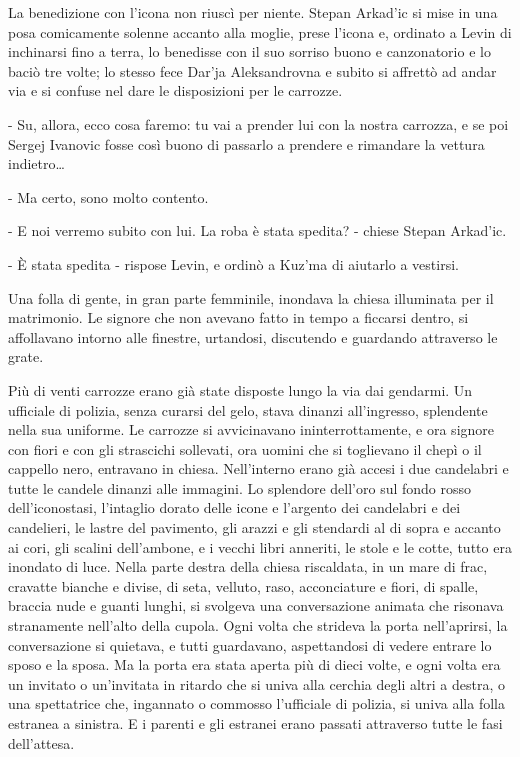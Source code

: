 La benedizione con l'icona non riuscì per niente. Stepan Arkad'ic si mise in una posa comicamente solenne accanto alla moglie, prese l'icona e, ordinato a Levin di inchinarsi fino a terra, lo benedisse con il suo sorriso buono e canzonatorio e lo baciò tre volte; lo stesso fece Dar'ja Aleksandrovna e subito si affrettò ad andar via e si confuse nel dare le disposizioni per le carrozze. 

- Su, allora, ecco cosa faremo: tu vai a prender lui con la nostra carrozza, e se poi Sergej Ivanovic fosse così buono di passarlo a prendere e rimandare la vettura indietro\ldots{} 

- Ma certo, sono molto contento. 

- E noi verremo subito con lui. La roba è stata spedita? - chiese Stepan Arkad'ic. 

- È stata spedita - rispose Levin, e ordinò a Kuz'ma di aiutarlo a vestirsi. 

Una folla di gente, in gran parte femminile, inondava la chiesa illuminata per il matrimonio. Le signore che non avevano fatto in tempo a ficcarsi dentro, si affollavano intorno alle finestre, urtandosi, discutendo e guardando attraverso le grate. 

Più di venti carrozze erano già state disposte lungo la via dai gendarmi. Un ufficiale di polizia, senza curarsi del gelo, stava dinanzi all'ingresso, splendente nella sua uniforme. Le carrozze si avvicinavano ininterrottamente, e ora signore con fiori e con gli strascichi sollevati, ora uomini che si toglievano il chepì o il cappello nero, entravano in chiesa. Nell'interno erano già accesi i due candelabri e tutte le candele dinanzi alle immagini. Lo splendore dell'oro sul fondo rosso dell'iconostasi, l'intaglio dorato delle icone e l'argento dei candelabri e dei candelieri, le lastre del pavimento, gli arazzi e gli stendardi al di sopra e accanto ai cori, gli scalini dell'ambone, e i vecchi libri anneriti, le stole e le cotte, tutto era inondato di luce. Nella parte destra della chiesa riscaldata, in un mare di frac, cravatte bianche e divise, di seta, velluto, raso, acconciature e fiori, di spalle, braccia nude e guanti lunghi, si svolgeva una conversazione animata che risonava stranamente nell'alto della cupola. Ogni volta che strideva la porta nell'aprirsi, la conversazione si quietava, e tutti guardavano, aspettandosi di vedere entrare lo sposo e la sposa. Ma la porta era stata aperta più di dieci volte, e ogni volta era un invitato o un'invitata in ritardo che si univa alla cerchia degli altri a destra, o una spettatrice che, ingannato o commosso l'ufficiale di polizia, si univa alla folla estranea a sinistra. E i parenti e gli estranei erano passati attraverso tutte le fasi dell'attesa. 

